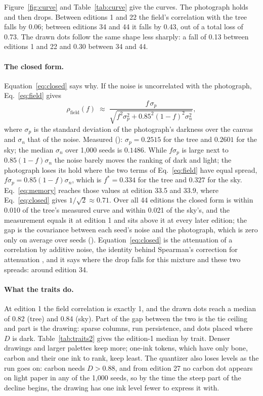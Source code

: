 \documentclass[11pt]{article}
\begin{document}
Figure~\ref{fig:curve} and Table~\ref{tab:curve} give the curves. The photograph holds and then drops. Between editions 1 and 22 the field's correlation with the tree falls by 0.06; between editions 34 and 44 it falls by 0.43, out of a total loss of 0.73. The drawn dots follow the same shape less sharply: a fall of 0.13 between editions 1 and 22 and 0.30 between 34 and 44.

\paragraph{The closed form.} Equation~\eqref{eq:closed} says why. If the noise is uncorrelated with the photograph, Eq.~\eqref{eq:field} gives
\begin{equation}
  \rho_{\text{field}}(f) \;\approx\; \frac{f\,\sigma_p}{\sqrt{f^2\sigma_p^2 + 0.85^2(1-f)^2\sigma_n^2}},
  \label{eq:closed}
\end{equation}
where $\sigma_p$ is the standard deviation of the photograph's darkness over the canvas and $\sigma_n$ that of the noise. Measured (): $\sigma_p = 0.2515$ for the tree and $0.2601$ for the sky; the median $\sigma_n$ over 1{,}000 seeds is $0.1486$. While $f\sigma_p$ is large next to $0.85(1-f)\sigma_n$ the noise barely moves the ranking of dark and light; the photograph loses its hold where the two terms of Eq.~\eqref{eq:field} have equal spread, $f\sigma_p = 0.85(1-f)\sigma_n$, which is $f^\ast = 0.334$ for the tree and $0.327$ for the sky. Eq.~\eqref{eq:memory} reaches those values at edition 33.5 and 33.9, where Eq.~\eqref{eq:closed} gives $1/\sqrt{2} \approx 0.71$. Over all 44 editions the closed form is within 0.010 of the tree's measured curve and within 0.021 of the sky's, and the measurement equals it at edition 1 and sits above it at every later edition; the gap is the covariance between each seed's noise and the photograph, which is zero only on average over seeds (). Equation~\eqref{eq:closed} is the attenuation of a correlation by additive noise, the identity behind Spearman's correction for attenuation \citep{spearman1904}, and it says where the drop falls for this mixture and these two spreads: around edition 34.

\paragraph{What the traits do.} At edition 1 the field correlation is exactly 1, and the drawn dots reach a median of 0.82 (tree) and 0.84 (sky). Part of the gap between the two is the tie ceiling and part is the drawing: sparse columns, run persistence, and dots placed where $D$ is dark. Table~\ref{tab:traits2} gives the edition-1 median by trait. Denser drawings and larger palettes keep more; one-ink tokens, which have only bone, carbon and their one ink to rank, keep least. The quantizer also loses levels as the run goes on: carbon needs $D > 0.88$, and from edition 27 no carbon dot appears on light paper in any of the 1{,}000 seeds, so by the time the steep part of the decline begins, the drawing has one ink level fewer to express it with.
\end{document}
